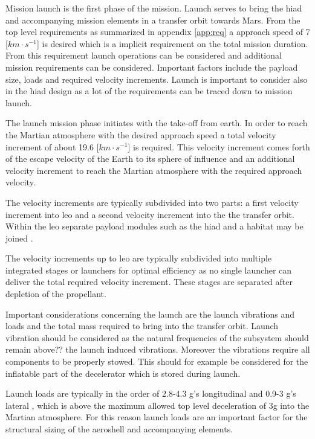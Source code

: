 Mission launch is the first phase of the mission. Launch serves to bring the \gls{hiad} and accompanying mission elements in a transfer orbit towards Mars. From the top level requirements as summarized in appendix \ref{app:req} a approach speed of 7 [$km\cdot s^{-1}$] is desired which is a implicit requirement on the total mission duration.
From this requirement launch operations can be considered and additional mission requirements can be considered. Important factors include the payload size, loads and required velocity increments. Launch is important to consider also in the \gls{hiad} design as a lot of the requirements can be traced down to mission launch.

The launch mission phase initiates with the take-off from earth. In order to reach the Martian atmosphere with the desired approach speed a total velocity increment of about 19.6 [$km\cdot s^{-1}$] is required. This velocity increment comes forth of the escape velocity of the Earth to its sphere of influence and an additional velocity increment to reach the Martian atmosphere with the required approach velocity.

The velocity increments are typically subdivided into two parts: a first velocity increment into \gls{leo} and a second velocity increment into the the transfer orbit. Within the \gls{leo} separate payload modules such as the \gls{hiad} and a habitat may be joined \cite{George2009}.

The velocity increments up to \gls{leo} are typically subdivided into multiple integrated stages or launchers for optimal efficiency as no single launcher can deliver the total required velocity increment. These stages are separated after depletion of the propellant.

Important considerations concerning the launch are the launch vibrations and loads and the total mass required to bring into the transfer orbit. Launch vibration should be considered as the natural frequencies of the subsystem should remain above?? the launch induced vibrations. Moreover the vibrations require all components to be properly stowed. This should for example be considered for the inflatable part of the decelerator which is stored during launch.

Launch loads are typically in the order of 2.8-4.3 g's longitudinal and 0.9-3 g's lateral \cite{Wertz2011}, which is above the maximum allowed top level deceleration of 3g into the Martian atmosphere. For this reason launch loads are an important factor for the structural sizing of the aeroshell and accompanying elements. 

